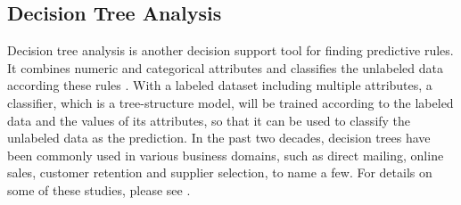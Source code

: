 \documentclass[12pt,english]{report}
\begin{document}

\subsection{Decision Tree Analysis}

Decision tree analysis is another decision support tool for finding predictive rules. It combines numeric and categorical attributes and classifies the unlabeled data according these rules \citep{han2011data}. With a labeled dataset including multiple attributes, a classifier, which is a tree-structure model, will be trained according to the labeled data and the values of its attributes, so that it can be used to classify the unlabeled data as the prediction. In the past two decades, decision trees have been commonly used in various business domains, such as direct mailing, online sales, customer retention and supplier selection, to name a few.  For details on some of these studies, please see \citep{dt_application1,dt_application2,dt_application3,dt_application4,dt_application5,dt_application6,dt_application7,dt_application8,dt_application9,dt_application10}. 
\end{document}
